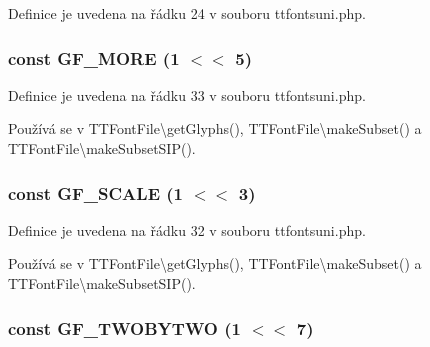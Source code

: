 Definice je uvedena na řádku 24 v souboru ttfontsuni.\-php.

\hypertarget{ttfontsuni_8php_ae1c1813b91e59b66297774d8dba04ea9}{
\subsubsection[{G\-F\-\_\-\-M\-O\-R\-E}]{\setlength{\rightskip}{0pt plus 5cm}const G\-F\-\_\-\-M\-O\-R\-E (1 $<$$<$ 5)}}\label{ttfontsuni_8php_ae1c1813b91e59b66297774d8dba04ea9}


Definice je uvedena na řádku 33 v souboru ttfontsuni.\-php.



Používá se v T\-T\-Font\-File\textbackslash{}get\-Glyphs(), T\-T\-Font\-File\textbackslash{}make\-Subset() a T\-T\-Font\-File\textbackslash{}make\-Subset\-S\-I\-P().

\hypertarget{ttfontsuni_8php_a84b402e5b87bb7783e7d04742255b6ad}{
\subsubsection[{G\-F\-\_\-\-S\-C\-A\-L\-E}]{\setlength{\rightskip}{0pt plus 5cm}const G\-F\-\_\-\-S\-C\-A\-L\-E (1 $<$$<$ 3)}}\label{ttfontsuni_8php_a84b402e5b87bb7783e7d04742255b6ad}


Definice je uvedena na řádku 32 v souboru ttfontsuni.\-php.



Používá se v T\-T\-Font\-File\textbackslash{}get\-Glyphs(), T\-T\-Font\-File\textbackslash{}make\-Subset() a T\-T\-Font\-File\textbackslash{}make\-Subset\-S\-I\-P().

\hypertarget{ttfontsuni_8php_a1d0d42be48bb8bdf9063333ba18fc169}{
\subsubsection[{G\-F\-\_\-\-T\-W\-O\-B\-Y\-T\-W\-O}]{\setlength{\rightskip}{0pt plus 5cm}const G\-F\-\_\-\-T\-W\-O\-B\-Y\-T\-W\-O (1 $<$$<$ 7)}}\label{ttfontsuni_8php_a1d0d42be48bb8bdf9063333ba18fc169}


